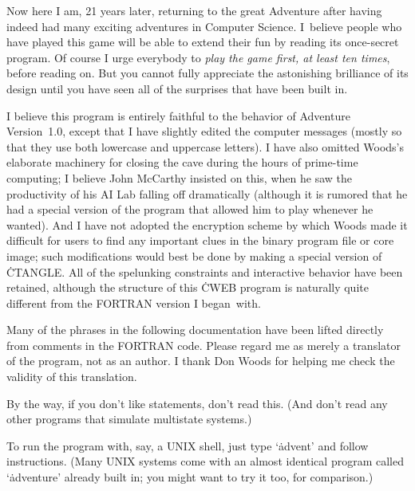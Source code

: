 Now here I am, 21 years later, returning to the great Adventure after
having indeed had many exciting adventures in Computer Science. I~believe
people who have played this game will be able to extend their fun by
reading its once-secret program. Of course I urge everybody to {\it play the
game first, at least ten times}, before reading on. But you cannot
fully appreciate the astonishing brilliance of its design until
you have seen all of the surprises that have been built in.

I believe this program is entirely faithful to the behavior of Adventure
Version~1.0, except that I have slightly edited the computer messages
(mostly so that they use both lowercase and uppercase letters). I have also
omitted Woods's elaborate machinery for closing the cave during the hours
of prime-time computing; I believe John McCarthy insisted on this, when
he saw the productivity of his AI Lab falling off dramatically (although
it is rumored that he had a special version of the program that
allowed him to play whenever he wanted). And I have
not adopted the encryption scheme by which Woods made it difficult for
users to find any important clues in
the binary program file or core image; such
modifications would best be done by making a special version of \.{CTANGLE}.
All of the spelunking constraints and interactive behavior have
been retained, although the structure of this \.{CWEB} program is
naturally quite different from the {\mc FORTRAN} version I began~with.

Many of the phrases in the following documentation have been lifted directly
from comments in the {\mc FORTRAN} code. Please regard me as merely
a translator of the program, not as an author. I thank Don Woods for
helping me check the validity of this translation.

By the way, if you don't like  statements, don't read this. (And don't
read any other programs that simulate multistate systems.)

\smallskip{}

\Y\B{}\par
\fi

To run the program with, say, a {\mc UNIX} shell, just type `\.{advent}'
and follow instructions. (Many {\mc UNIX} systems come with an
almost identical program called `\.{adventure}' already built in;
you might want to try it too, for comparison.)

